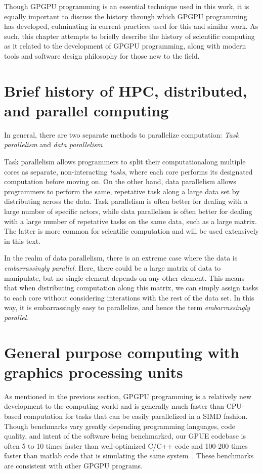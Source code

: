 Though GPGPU programming is an essential technique used in this work, it is equally important to discuss the history through which GPGPU programming has developed, culminating in current practices used for this and similar work.
As such, this chapter attempts to briefly describe the history of scientific computing as it related to the development of GPGPU programming, along with modern tools and software design philosophy for those new to the field.

\section{Brief history of HPC, distributed, and parallel computing}

In general, there are two separate methods to parallelize computation: \textit{Task parallelism} and \textit{data parallelism}

Task parallelism allows programmers to split their computationalong multiple cores as separate, non-interacting \textit{tasks}, where each core performs its designated computation before moving on.
On the other hand, data parallelism allows programmers to perform the same, repetative task along a large data set by distributing across the data.
Task parallelism is often better for dealing with a large number of specific actors, while data parallelism is often better for dealing with a large number of repetative tasks on the same data, such as a large matrix.
The latter is more common for scientific computation and will be used extensively in this text.

In the realm of data parallelism, there is an extreme case where the data is \textit{embarrassingly parallel}.
Here, there could be a large matrix of data to manipulate, but no single element depends on any other element.
This means that when distributing computation along this matrix, we can simply assign tasks to each core without considering interations with the rest of the data set.
In this way, it is embarrassingly easy to parallelize, and hence the term \textit{embarrassingly parallel}.

\section{General purpose computing with graphics processing units}

As mentioned in the previous section, GPGPU programming is a relatively new development to the computing world and is generally much faster than CPU-based computation for tasks that can be easily parallelized in a SIMD fashion.
Though benchmarks vary greatly depending programming languages, code quality, and intent of the software being benchmarked, our GPUE codebase is often 5 to 10 times faster than well-optimized C/C++ code and 100-200 times faster than matlab code that is simulating the same system~\cite{wittek2016}.
These benchmarks are consistent with other GPGPU programs.

